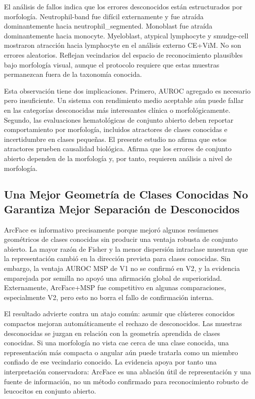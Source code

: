\documentclass[11pt]{article}
\begin{document}
El análisis de fallos indica que los errores desconocidos están estructurados por morfología. Neutrophil-band fue difícil externamente y fue atraída dominantemente hacia neutrophil\_segmented. Monoblast fue atraída dominantemente hacia monocyte. Myeloblast, atypical lymphocyte y smudge-cell mostraron atracción hacia lymphocyte en el análisis externo CE+ViM. No son errores aleatorios. Reflejan vecindarios del espacio de reconocimiento plausibles bajo morfología visual, aunque el protocolo requiere que estas muestras permanezcan fuera de la taxonomía conocida.

Esta observación tiene dos implicaciones. Primero, AUROC agregado es necesario pero insuficiente. Un sistema con rendimiento medio aceptable aún puede fallar en las categorías desconocidas más interesantes clínica o morfológicamente. Segundo, las evaluaciones hematológicas de conjunto abierto deben reportar comportamiento por morfología, incluidos atractores de clases conocidas e incertidumbre en clases pequeñas. El presente estudio no afirma que estos atractores prueben causalidad biológica. Afirma que los errores de conjunto abierto dependen de la morfología y, por tanto, requieren análisis a nivel de morfología.

\subsection{Una Mejor Geometría de Clases Conocidas No Garantiza Mejor Separación de Desconocidos}

ArcFace es informativo precisamente porque mejoró algunos resúmenes geométricos de clases conocidas sin producir una ventaja robusta de conjunto abierto. La mayor razón de Fisher y la menor dispersión intraclase muestran que la representación cambió en la dirección prevista para clases conocidas. Sin embargo, la ventaja AUROC MSP de V1 no se confirmó en V2, y la evidencia emparejada por semilla no apoyó una afirmación global de superioridad. Externamente, ArcFace+MSP fue competitivo en algunas comparaciones, especialmente V2, pero esto no borra el fallo de confirmación interna.

El resultado advierte contra un atajo común: asumir que clústeres conocidos compactos mejoran automáticamente el rechazo de desconocidos. Las muestras desconocidas se juzgan en relación con la geometría aprendida de clases conocidas. Si una morfología no vista cae cerca de una clase conocida, una representación más compacta o angular aún puede tratarla como un miembro confiado de ese vecindario conocido. La evidencia apoya por tanto una interpretación conservadora: ArcFace es una ablación útil de representación y una fuente de información, no un método confirmado para reconocimiento robusto de leucocitos en conjunto abierto.
\end{document}
